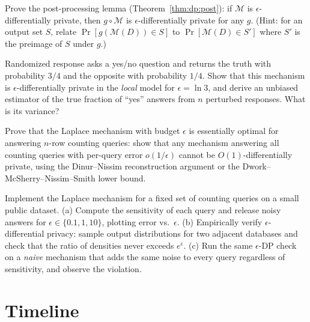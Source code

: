 \begin{exercise}[Intermediate]
Prove the post-processing lemma (Theorem~\ref{thm:dp:post}): if $\mathcal{M}$ is $\epsilon$-differentially private, then $g \circ \mathcal{M}$ is $\epsilon$-differentially private for any $g$. (Hint: for an output set $S$, relate $\Pr[g(\mathcal{M}(D)) \in S]$ to $\Pr[\mathcal{M}(D) \in S']$ where $S'$ is the preimage of $S$ under $g$.)
\end{exercise}

\begin{exercise}[Intermediate]
Randomized response asks a yes/no question and returns the truth with probability $3/4$ and the opposite with probability $1/4$. Show that this mechanism is $\epsilon$-differentially private in the \emph{local} model for $\epsilon = \ln 3$, and derive an unbiased estimator of the true fraction of ``yes'' answers from $n$ perturbed responses. What is its variance?
\end{exercise}

\begin{exercise}[Challenge]
Prove that the Laplace mechanism with budget $\epsilon$ is essentially optimal for answering $n$-row counting queries: show that any mechanism answering all counting queries with per-query error $o(1/\epsilon)$ cannot be $O(1)$-differentially private, using the Dinur--Nissim reconstruction argument or the Dwork--McSherry--Nissim--Smith lower bound.
\end{exercise}

\begin{exercise}[Computational]
Implement the Laplace mechanism for a fixed set of counting queries on a small public dataset. (a) Compute the sensitivity of each query and release noisy answers for $\epsilon \in \{0.1, 1, 10\}$, plotting error vs.\ $\epsilon$. (b) Empirically verify $\epsilon$-differential privacy: sample output distributions for two adjacent databases and check that the ratio of densities never exceeds $e^{\epsilon}$. (c) Run the same $\epsilon$-DP check on a \emph{naive} mechanism that adds the same noise to every query regardless of sensitivity, and observe the violation.
\end{exercise}

\section{Timeline}
\label{sec:dp:timeline}

